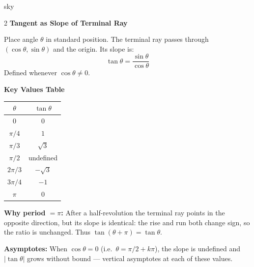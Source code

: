 \documentclass[10pt]{article}
\begin{document}
\begin{skillbox}{sky}
  \begin{multicols}{2}
  \textbf{Tangent as Slope of Terminal Ray}

  Place angle $\theta$ in standard position. The terminal ray passes
  through $(\cos\theta,\sin\theta)$ and the origin. Its slope is:
  \[
    \tan\theta = \frac{\sin\theta}{\cos\theta}
  \]
  Defined whenever $\cos\theta\neq 0$.

  \columnbreak

  \textbf{Key Values Table}

  \renewcommand{\arraystretch}{1.35}
  \begin{tabular}{|c|c|}
  \hline
  $\theta$ & $\tan\theta$ \\
  \hline
  $0$        & $0$ \\
  $\pi/4$    & $1$ \\
  $\pi/3$    & $\sqrt{3}$ \\
  $\pi/2$    & undefined \\
  $2\pi/3$   & $-\sqrt{3}$ \\
  $3\pi/4$   & $-1$ \\
  $\pi$      & $0$ \\
  \hline
  \end{tabular}
  \end{multicols}

  \textbf{Why period $= \pi$:} After a half-revolution the terminal ray
  points in the opposite direction, but its slope is identical: the rise
  and run both change sign, so the ratio is unchanged.  Thus
  $\tan(\theta+\pi)=\tan\theta$.

  \medskip
  \textbf{Asymptotes:} When $\cos\theta=0$ (i.e.\ $\theta=\pi/2+k\pi$),
  the slope is undefined and $|\tan\theta|$ grows without bound --- vertical
  asymptotes at each of these values.
\end{skillbox}
\end{document}
